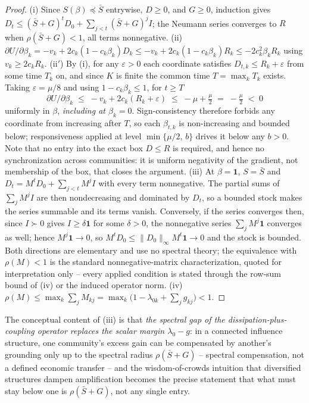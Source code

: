 \documentclass[11pt]{article}
\theoremstyle{definition}
\theoremstyle{remark}
\numberwithin{equation}{section}
\begin{document}
\begin{proof}
(i) Since $S(\beta)\preceq\bar S$ entrywise, $D\ge0$, and $G\ge0$, induction gives $D_t\le(\bar S+G)^tD_0+\sum_{j<t}(\bar S+G)^jI$; the Neumann series converges to $R$ when $\rho(\bar S+G)<1$, all terms nonnegative. (ii) $\partial U/\partial\beta_k=-v_k+2c_k(1-c_k\beta_k)D_k\le-v_k+2c_k(1-c_k\beta_k)R_k\le-2c_k^2\beta_kR_k$ using $v_k\ge2c_kR_k$. (ii$'$) By (i), for any $\varepsilon>0$ each coordinate satisfies $D_{t,k}\le R_k+\varepsilon$ from some time $T_k$ on, and since $K$ is finite the common time $T=\max_k T_k$ exists. Taking $\varepsilon=\mu/8$ and using $1-c_k\beta_k\le1$, for $t\ge T$
\[
\partial U/\partial\beta_k \;\le\; -v_k+2c_k(R_k+\varepsilon) \;\le\; -\mu+\tfrac{\mu}{2} \;=\; -\tfrac{\mu}{2}\;<\;0
\]
uniformly in $\beta$, \emph{including at $\beta_k=0$}. Sign-consistency therefore forbids any coordinate from increasing after $T$, so each $\beta_{t,k}$ is non-increasing and bounded below; responsiveness applied at level $\min\{\mu/2,\,b\}$ drives it below any $b>0$. Note that no entry into the exact box $D\le R$ is required, and hence no synchronization across communities: it is uniform negativity of the gradient, not membership of the box, that closes the argument. (iii) At $\beta=\mathbf{1}$, $S=\bar S$ and $D_t=M^tD_0+\sum_{j<t}M^jI$ with every term nonnegative. The partial sums of $\sum_jM^jI$ are then nondecreasing and dominated by $D_t$, so a bounded stock makes the series summable and its terms vanish. Conversely, if the series converges then, since $I\succ0$ gives $I\ge\delta\mathbf{1}$ for some $\delta>0$, the nonnegative series $\sum_jM^j\mathbf{1}$ converges as well; hence $M^j\mathbf{1}\to0$, so $M^tD_0\le\lVert D_0\rVert_\infty M^t\mathbf{1}\to0$ and the stock is bounded. Both directions are elementary and use no spectral theory; the equivalence with $\rho(M)<1$ is the standard nonnegative-matrix characterization, quoted for interpretation only -- every applied condition is stated through the row-sum bound of (iv) or the induced operator norm. (iv) $\rho(M)\le\max_k\sum_j M_{kj}=\max_k\bigl(1-\lambda_{0k}+\sum_j g_{kj}\bigr)<1$.
\end{proof}

The conceptual content of (iii) is that \emph{the spectral gap of the dissipation-plus-coupling operator replaces the scalar margin $\lambda_0-g$}: in a connected influence structure, one community's excess gain can be compensated by another's grounding only up to the spectral radius $\rho(\bar S+G)$ -- spectral compensation, not a defined economic transfer -- and the wisdom-of-crowds intuition that diversified structures dampen amplification \citep{golub2010naive} becomes the precise statement that what must stay below one is $\rho(\bar S+G)$, not any single entry.
\end{document}
